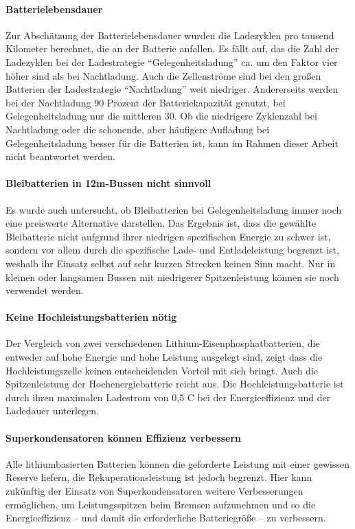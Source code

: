 \paragraph{Batterielebensdauer} Zur Abschätzung der Batterielebensdauer wurden die Ladezyklen pro tausend Kilometer berechnet, die an der Batterie anfallen. Es fällt auf, das die Zahl der Ladezyklen bei der Ladestrategie "`Gelegenheitsladung"' ca. um den Faktor vier höher sind als bei Nachtladung. Auch die Zellenströme sind bei den großen Batterien der Ladestrategie "`Nachtladung"' weit niedriger. Andererseits werden bei der Nachtladung 90 Prozent der Batteriekapazität genutzt, bei Gelegenheitsladung nur die mittleren 30. Ob die niedrigere Zyklenzahl bei Nachtladung oder die schonende, aber häufigere Aufladung bei Gelegenheitsladung besser für die Batterien ist, kann im Rahmen dieser Arbeit nicht beantwortet werden.

\paragraph{Bleibatterien in 12m-Bussen nicht sinnvoll} Es wurde auch untersucht, ob Bleibatterien bei Gelegenheitsladung immer noch eine preiswerte Alternative darstellen. Das Ergebnis ist, dass die gewählte Bleibatterie nicht aufgrund ihrer niedrigen spezifischen Energie zu schwer ist, sondern vor allem durch die spezifische Lade- und Entladeleistung begrenzt ist, weshalb ihr Einsatz selbst auf sehr kurzen Strecken keinen Sinn macht. Nur in kleinen oder langsamen Bussen mit niedrigerer Spitzenleistung können sie noch verwendet werden.

\paragraph{Keine Hochleistungsbatterien nötig} Der Vergleich von zwei verschiedenen Lithium-Eisenphosphatbatterien, die entweder auf hohe Energie und hohe Leistung ausgelegt sind, zeigt dass die Hochleistungszelle keinen entscheidenden Vorteil mit sich bringt. Auch die Spitzenleistung der Hochenergiebatterie reicht aus. Die Hochleistungsbatterie ist durch ihren maximalen Ladestrom von 0,5 C bei  der Energieeffizienz und der Ladedauer unterlegen.

\paragraph{Superkondensatoren können Effizienz verbessern} Alle lithiumbasierten Batterien können die geforderte Leistung mit einer gewissen Reserve liefern, die Rekuperationsleistung ist jedoch begrenzt. Hier kann zukünftig der Einsatz von Superkondensatoren weitere Verbesserungen ermöglichen, um Leistungsspitzen beim Bremsen aufzunehmen und so die Energieeffizienz – und damit die erforderliche Batteriegröße – zu verbessern.


